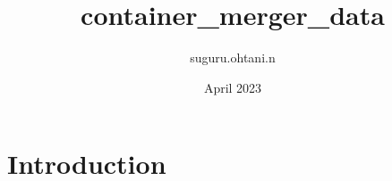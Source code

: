 \documentclass{article}
\title{container_merger_data}
\author{suguru.ohtani.n }
\date{April 2023}
\begin{document}
\maketitle

\section{Introduction}
\end{document}

